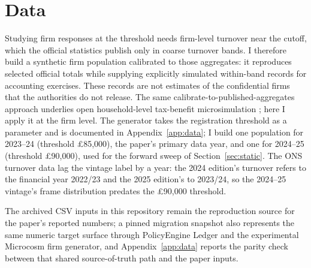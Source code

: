 \section{Data}
\label{sec:data}

Studying firm responses at the threshold needs firm-level turnover near the
cutoff, which the official statistics publish only in coarse turnover bands. I
therefore build a synthetic firm population calibrated to those aggregates: it
reproduces selected official totals while supplying explicitly simulated
within-band records for accounting exercises. These records are not estimates
of the confidential firms that the authorities do not release. The same
calibrate-to-published-aggregates approach underlies open household-level
tax-benefit microsimulation \citep{policyengine}; here I apply it at the firm
level. The generator takes the registration threshold as a parameter and is
documented in Appendix~\ref{app:data}; I build one population for 2023--24
(threshold \pounds85{,}000), the paper's primary data year, and one for
2024--25 (threshold \pounds90{,}000), used for the forward sweep of
Section~\ref{sec:static}. The ONS turnover data lag the vintage label by a
year: the 2024 edition's turnover refers to the financial year 2022/23 and the
2025 edition's to 2023/24, so the 2024--25 vintage's frame distribution
predates the \pounds90{,}000 threshold.

The archived CSV inputs in this repository remain the reproduction source for
the paper's reported numbers; a pinned migration snapshot also represents the
same numeric target surface through PolicyEngine Ledger and the
experimental Microcosm firm generator, and Appendix~\ref{app:data} reports the
parity check between that shared source-of-truth path and the paper inputs.

